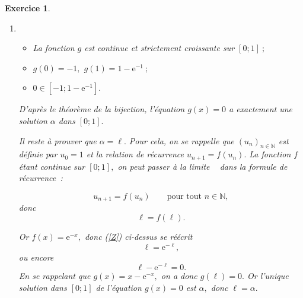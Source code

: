 \documentclass[10pt]{article}
\newtheorem{exo}{Exercice}
\begin{document}
\begin{exo}
\begin{enumerate}
\begin{enumerate}
\medskip

\setlength{\columnseprule}{1pt}

\begin{multicols}{2}
\begin{center}
\end{center}

\columnbreak

\begin{itemize}
\item[\textbullet] $g(0)=0-\text{e}^{-0}=0-1=-1$
\item[\textbullet] $g(1)=1-\text{e}^{-1}\approx 0,63$
\end{itemize}


\end{multicols}
  \item \begin{itemize}
\item[\textbullet] La fonction $g$ est continue et strictement croissante sur $\left[0;1\right]~;$
\item[\textbullet] $g(0)=-1,$ $g(1)=1-\text{e}^{-1}~;$
\item[\textbullet] $0\in\left[-1;1-\text{e}^{-1}\right].$
\end{itemize}

D'après le théorème de la bijection, l'équation $g(x)=0$ a exactement une solution  $\alpha$ dans $\left[0;1\right].$

\medskip

Il reste à prouver que $\alpha=\ell.$ Pour cela, on se rappelle que $(u_n)_{n\in\mathbb{N}}$ est définie par $u_0=1$ et la relation de récurrence $u_{n+1}=f\left(u_n\right).$ La fonction $f$ étant continue sur $\left[0;1\right],$ on peut \og passer à la limite \fg~{} dans la formule de récurrence~:

\[u_{n+1}=f\left(u_n\right)\qquad\text{pour tout }n\in\mathbb{N},\] donc
\begin{equation}\label{Z}\ell=f(\ell).
\end{equation}

Or $f(x)=\text{e}^{-x},$ donc (\ref{Z}) ci-dessus se réécrit
\[\ell=\text{e}^{-\ell},\] ou encore \begin{equation}\label{Y}\ell-\text{e}^{-\ell}=0.\end{equation} En se rappelant que $g(x)=x-\text{e}^{-x},$ on a donc $g(\ell)=0.$ Or l'unique solution dans $\left[0;1\right]$ de l'équation $g(x)=0$ est $\alpha,$ donc $\ell=\alpha.$


\end{enumerate}
\end{enumerate}
\end{exo}
\end{document}
